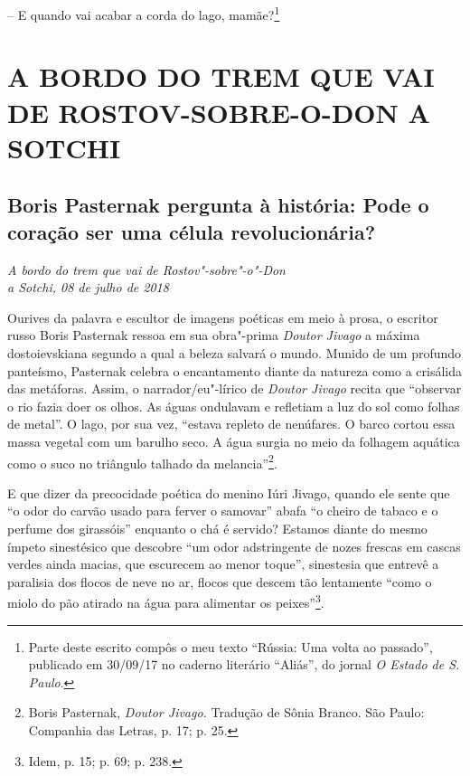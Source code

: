 -- E quando vai acabar a corda do lago, mamãe?\footnote{Parte deste
  escrito compôs o meu texto ``Rússia: Uma volta ao passado'', publicado
  em 30/09/17 no caderno literário ``Aliás'', do jornal \emph{O Estado
  de S. Paulo}.}

\clearpage{\pagestyle{empty}\cleardoublepage}
\movetooddpage
{}
\part*{A BORDO DO TREM QUE VAI DE ROSTOV-SOBRE-O-DON A SOTCHI}

\chapter*{Boris Pasternak pergunta à história: Pode o coração ser uma célula revolucionária?}

\begin{flushright}
\emph{A bordo do trem que vai de Rostov"-sobre"-o"-Don\\a Sotchi, 08 de julho de
2018}
\end{flushright}

Ourives da palavra e escultor de imagens poéticas em meio à prosa, o
escritor russo Boris Pasternak ressoa em sua obra"-prima \emph{Doutor
Jivago} a máxima dostoievskiana segundo a qual a beleza salvará o mundo.
Munido de um profundo panteísmo, Pasternak celebra o encantamento diante
da natureza como a crisálida das metáforas. Assim, o narrador/eu"-lírico
de \emph{Doutor Jivago} recita que ``observar o rio fazia doer os olhos.
As águas ondulavam e refletiam a luz do sol como folhas de metal''. O
lago, por sua vez, ``estava repleto de nenúfares. O barco cortou essa
massa vegetal com um barulho seco. A água surgia no meio da folhagem
aquática como o suco no triângulo talhado da melancia''\footnote{Boris
  Pasternak, \emph{Doutor Jivago.} Tradução de Sônia Branco. São Paulo:
  Companhia das Letras, p. 17; p. 25.}.

E que dizer da precocidade poética do menino Iúri Jivago, quando ele
sente que ``o odor do carvão usado para ferver o samovar'' abafa ``o
cheiro de tabaco e o perfume dos girassóis'' enquanto o chá é servido?
Estamos diante do mesmo ímpeto sinestésico que descobre ``um odor
adstringente de nozes frescas em cascas verdes ainda macias, que
escurecem ao menor toque'', sinestesia que entrevê a paralisia dos
flocos de neve no ar, flocos que descem tão lentamente ``como o miolo do
pão atirado na água para alimentar os peixes''\footnote{Idem, p. 15; p.
  69; p. 238.}.

